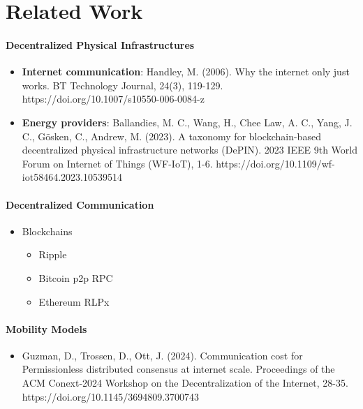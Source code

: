 \section{Related Work}

\begin{frame}
    \paragraph{Decentralized Physical Infrastructures}
    \begin{itemize}
        \item \textbf{Internet communication}: Handley, M. (2006). Why the internet only just works. BT Technology Journal, 24(3), 119-129. https://doi.org/10.1007/s10550-006-0084-z
        \item \textbf{Energy providers}: Ballandies, M. C., Wang, H., Chee Law, A. C., Yang, J. C., Gösken, C., Andrew, M. (2023). A taxonomy for blockchain-based decentralized physical infrastructure networks (DePIN). 2023 IEEE 9th World Forum on Internet of Things (WF-IoT), 1-6. https://doi.org/10.1109/wf-iot58464.2023.10539514
    \end{itemize}
    
    \paragraph{Decentralized Communication}
    \begin{itemize}
        \item Blockchains 
        \begin{itemize}
            \item Ripple
            \item Bitcoin p2p RPC
            \item Ethereum RLPx
        \end{itemize}
    \end{itemize}

    \paragraph{Mobility Models}
    \begin{itemize}
        \item Guzman, D., Trossen, D., Ott, J. (2024). Communication cost for Permissionless distributed consensus at internet scale. Proceedings of the ACM Conext-2024 Workshop on the Decentralization of the Internet, 28-35. https://doi.org/10.1145/3694809.3700743
    \end{itemize}
\end{frame}